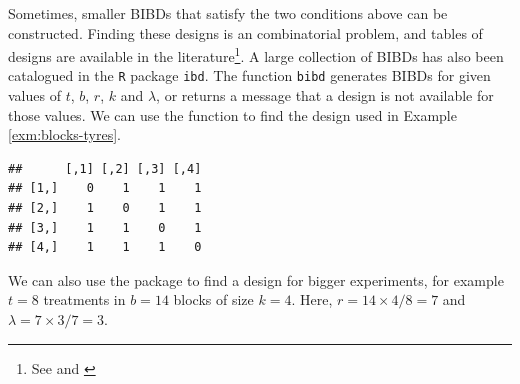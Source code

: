 \documentclass[
]{book}
\newenvironment{Shaded}{\begin{snugshade}}{\end{snugshade}}
\newcommand{\AttributeTok}[1]{\textcolor[rgb]{0.77,0.63,0.00}{#1}}
\newcommand{\CommentTok}[1]{\textcolor[rgb]{0.56,0.35,0.01}{\textit{#1}}}
\newcommand{\DecValTok}[1]{\textcolor[rgb]{0.00,0.00,0.81}{#1}}
\newcommand{\FunctionTok}[1]{\textcolor[rgb]{0.00,0.00,0.00}{#1}}
\newcommand{\NormalTok}[1]{#1}
\newcommand{\OtherTok}[1]{\textcolor[rgb]{0.56,0.35,0.01}{#1}}
\newcommand{\SpecialCharTok}[1]{\textcolor[rgb]{0.00,0.00,0.00}{#1}}
\theoremstyle{definition}
\theoremstyle{definition}
\theoremstyle{definition}
\theoremstyle{definition}
\theoremstyle{remark}
\begin{document}
Sometimes, smaller BIBDs that satisfy the two conditions above can be constructed. Finding these designs is an combinatorial problem, and tables of designs are available in the literature\footnote{See \citet{CochranCox1957} and \citet{FisherYates1963}}. A large collection of BIBDs has also been catalogued in the \texttt{R} package \texttt{ibd}. The function \texttt{bibd} generates BIBDs for given values of \(t\), \(b\), \(r\), \(k\) and \(\lambda\), or returns a message that a design is not available for those values. We can use the function to find the design used in Example \ref{exm:blocks-tyres}.

\begin{Shaded}
\end{Shaded}

\begin{verbatim}
##      [,1] [,2] [,3] [,4]
## [1,]    0    1    1    1
## [2,]    1    0    1    1
## [3,]    1    1    0    1
## [4,]    1    1    1    0
\end{verbatim}

We can also use the package to find a design for bigger experiments, for example \(t=8\) treatments in \(b=14\) blocks of size \(k=4\). Here, \(r = 14\times 4 / 8 = 7\) and \(\lambda = 7 \times 3 / 7 = 3\).

\begin{Shaded}
\end{Shaded}
\end{document}

